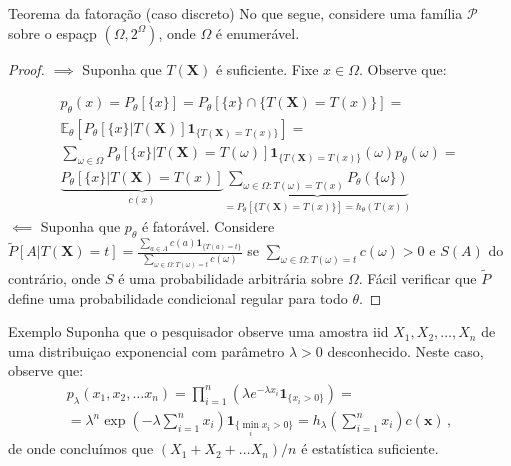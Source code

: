 \documentclass[11pt]{beamer}
\begin{document}
	\begin{frame}{Teorema da fatoração (caso discreto)}
		No que segue, considere uma família $\mathcal{P}$ sobre o espaçp $(\Omega, 2^\Omega)$, onde $\Omega$ é enumerável.
		\begin{proof}
			\footnotesize
			$\implies$ Suponha que $T(\boldsymbol{X})$ é suficiente. Fixe $x \in \Omega$. Observe que:
			
			\begin{align*}
			p_{\theta}(x) = P_\theta[\{ x\}] =  P_\theta[\{x\} \cap \{T(\boldsymbol{X})= T(x)\}] =\\
			  \mathbb{E}_\theta[P_\theta[\{x\}|T(\boldsymbol{X})] \mathbf{1}_{\{T(\boldsymbol{X}) = T(x)\}}] =\\ \sum_{\omega \in \Omega}  P_\theta[\{x\}|T(\boldsymbol{X}) = T(\omega)] \mathbf{1}_{\{T(\boldsymbol{X}) = T(x)\}}(\omega) p_\theta(\omega) = \\
			  	 \underbrace{P_\theta[\{x\}|T(\boldsymbol{X})=T(x)]}_{c(x)} \underbrace{\sum_{\omega \in \Omega: T(\omega)= T(x)} P_\theta(\{\omega\})}_{=P_\theta[\{T(\boldsymbol{X}) = T(x)\}] = h_{\theta}(T(x))}
			\end{align*}
			$\impliedby$ Suponha que $p_\theta$ é fatorável. Considere $\tilde{P}[A|T(\boldsymbol{X}) = t] = \frac{\sum_{a\in A}c(a) \mathbf{1}_{\{T(a) = t\}}}{\sum_{\omega \in \Omega : T(\omega) = t} c(\omega)}$ se $\sum_{\omega \in \Omega : T(\omega) = t} c(\omega)>0$ e $S(A)$ do contrário, onde $S$ é uma probabilidade arbitrária sobre $\Omega$. Fácil verificar que $\tilde{P}$ define uma probabilidade condicional regular para todo $\theta$.
		\end{proof}
		
		
		

\end{frame}
	
	\begin{frame}{Exemplo}
		Suponha que o pesquisador observe uma amostra iid $X_1,X_2, \ldots, X_n$ de uma distribuiçao exponencial com parâmetro $\lambda > 0$ desconhecido.  Neste caso, observe que:
		\begin{equation*}
			\begin{aligned}
				p_\lambda(x_1,x_2,\ldots x_n) = \prod_{i=1}^n (\lambda e^{-\lambda x_i} \mathbf{1}_{\{x_i>0\}}) =\\ =  \lambda^n \exp\left(- \lambda \sum_{i=1}^n x_i\right)\mathbf{1}_{\{\min_i x_i > 0 \}} = h_\lambda \left(\sum_{i=1}^n x_i\right) c(\boldsymbol{x}) \, ,
			\end{aligned}
		\end{equation*}
		de onde concluímos que $(X_1+X_2 + \ldots X_n)/n$ é estatística suficiente.
		
	\end{frame}
	
\end{document}
